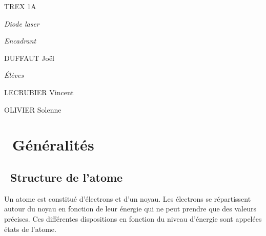 \documentclass[12pt,twoside]{article}
\begin{document}
\bigskip


\bigskip


\bigskip


\bigskip


\bigskip

{ 
\par}


\bigskip


\bigskip


\bigskip


\bigskip


\bigskip

{\centering
TREX 1A
\par}


\bigskip

{\centering\itshape
Diode laser
\par}


\bigskip


\bigskip


\bigskip


\bigskip


\bigskip


\bigskip


\bigskip


\bigskip


\bigskip


\bigskip

{\itshape
Encadrant}

DUFFAUT Jo\"el


\bigskip

{\itshape
\'El\`eves}

LECRUBIER Vincent

OLIVIER Solenne

\setcounter{tocdepth}{10}
\renewcommand\contentsname{Sommaire}
\tableofcontents

\bigskip

\clearpage\section[\ G\'en\'eralit\'es]{\ G\'en\'eralit\'es}
\subsection[\ Structure de l'atome]{\ Structure de l'atome}
Un atome est constitu\'e d'\'electrons et d'un noyau. Les \'electrons se
r\'epartissent autour du noyau en fonction de leur \'energie qui ne
peut prendre que des valeurs pr\'ecises. Ces diff\'erentes dispositions
en fonction du niveau d'\'energie sont appel\'ees \'etats de l'atome.
\end{document}
